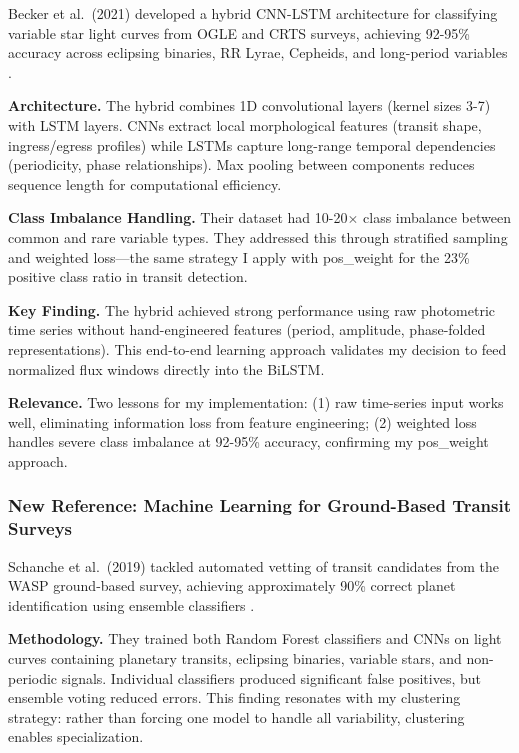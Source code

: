 \documentclass[letterpaper]{article} %
\begin{document}
Becker et al.\ (2021) developed a hybrid CNN-LSTM architecture for classifying variable star light curves from OGLE and CRTS surveys, achieving 92-95\% accuracy across eclipsing binaries, RR Lyrae, Cepheids, and long-period variables \cite{Becker2021variablestars}.

\textbf{Architecture.} The hybrid combines 1D convolutional layers (kernel sizes 3-7) with LSTM layers. CNNs extract local morphological features (transit shape, ingress/egress profiles) while LSTMs capture long-range temporal dependencies (periodicity, phase relationships). Max pooling between components reduces sequence length for computational efficiency.

\textbf{Class Imbalance Handling.} Their dataset had 10-20$\times$ class imbalance between common and rare variable types. They addressed this through stratified sampling and weighted loss---the same strategy I apply with pos\_weight for the 23\% positive class ratio in transit detection.

\textbf{Key Finding.} The hybrid achieved strong performance using raw photometric time series without hand-engineered features (period, amplitude, phase-folded representations). This end-to-end learning approach validates my decision to feed normalized flux windows directly into the BiLSTM.

\textbf{Relevance.} Two lessons for my implementation: (1) raw time-series input works well, eliminating information loss from feature engineering; (2) weighted loss handles severe class imbalance at 92-95\% accuracy, confirming my pos\_weight approach.

\subsubsection{New Reference: Machine Learning for Ground-Based Transit Surveys}

Schanche et al.\ (2019) tackled automated vetting of transit candidates from the WASP ground-based survey, achieving approximately 90\% correct planet identification using ensemble classifiers \cite{Schanche2019mlexoplanet}.

\textbf{Methodology.} They trained both Random Forest classifiers and CNNs on light curves containing planetary transits, eclipsing binaries, variable stars, and non-periodic signals. Individual classifiers produced significant false positives, but ensemble voting reduced errors. This finding resonates with my clustering strategy: rather than forcing one model to handle all variability, clustering enables specialization.
\end{document}
